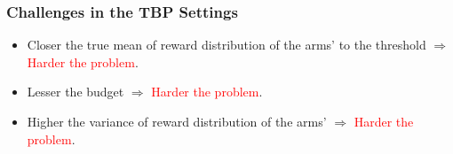 \begin{frame}
\frametitle{Challenges in the TBP Settings}

\begin{itemize}
\item<1-> Closer the true mean of reward distribution of the arms' to the threshold $\Rightarrow$ \textcolor{red}{Harder the problem}.
\vspace*{6mm}
\item<2-> Lesser the budget $\Rightarrow$ \textcolor{red}{Harder the problem}.
\vspace*{6mm}
\item<3-> Higher the variance of reward distribution of the arms' $\Rightarrow$ \textcolor{red}{Harder the problem}.


\end{itemize}

\end{frame}



